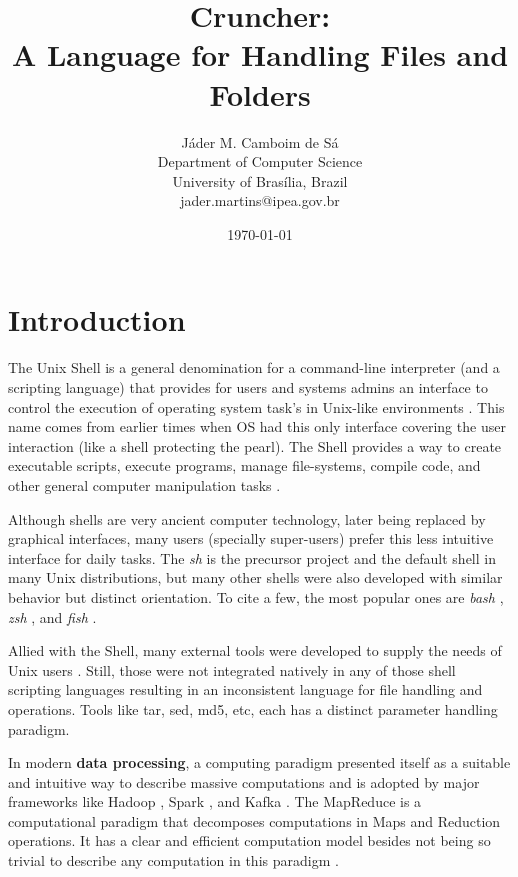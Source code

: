 \documentclass{article}
\title{Cruncher:\\
\large A Language for Handling Files and Folders}
\author{Jáder M. Camboim de Sá \\
        Department of Computer Science\\
        University of Brasília, Brazil \\
        jader.martins@ipea.gov.br}
\date{\today}
\begin{document}
\maketitle

\section{Introduction}
\label{sec:intro}
The Unix Shell is a general denomination for a command-line interpreter
(and a scripting language) that provides for users and systems admins an
interface to control the execution of operating system task's in Unix-like
environments \cite{negus2010linux}. This name comes from earlier times
when OS had this only interface covering the user interaction (like a shell
protecting the pearl). The Shell provides a way to create executable scripts,
execute programs, manage file-systems, compile code, and other general computer
manipulation tasks \cite{negus2010linux,blum2008linux}.

Although shells are very ancient computer technology, later being replaced by
graphical interfaces, many users (specially super-users) prefer this less
intuitive interface \cite{newham2005learning} for daily tasks. The \textit{sh}
is the precursor project and the default shell in many Unix distributions, but
many other shells were also developed with similar behavior but distinct
orientation. To cite a few, the most popular ones are \textit{bash}
\cite{bash}, \textit{zsh} \cite{zsh}, and \textit{fish} \cite{fish}.

Allied with the Shell, many external tools were developed to supply the needs
of Unix users \cite{negus2010linux}. Still, those were not integrated natively
in any of those shell scripting languages resulting in an inconsistent language
for file handling and operations. Tools like tar, sed, md5, etc, each has a
distinct parameter handling paradigm.

In modern \textbf{data processing}, a computing paradigm presented itself as a
suitable and intuitive way to describe massive computations and is adopted by
major frameworks like Hadoop \cite{white2012hadoop}, Spark
\cite{chambers2018spark}, and Kafka \cite{narkhede2017kafka}. The MapReduce is
a computational paradigm that decomposes computations in Maps and Reduction
operations. It has a clear and efficient computation model besides not being
so trivial to describe any computation in this paradigm
\cite{afrati2012vision}.
\end{document}
